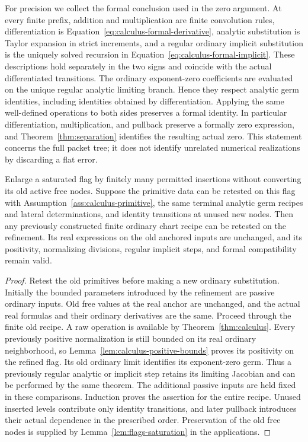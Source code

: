 For precision we collect the formal conclusion used in the zero argument.
At every finite prefix, addition and multiplication are finite convolution
rules, differentiation is Equation~\eqref{eq:calculus-formal-derivative},
analytic substitution is Taylor expansion in strict increments, and a
regular ordinary implicit substitution is the uniquely solved recursion
in Equation~\eqref{eq:calculus-formal-implicit}.  These descriptions hold
separately in the two signs and coincide with the actual differentiated
transitions.  The ordinary exponent-zero coefficients are evaluated on
the unique regular analytic limiting branch.  Hence they respect analytic germ
identities, including identities obtained by differentiation.  Applying the
same well-defined operations to both sides preserves a formal identity.
In particular differentiation, multiplication, and pullback preserve a
formally zero expression, and Theorem~\ref{thm:separation} identifies the
resulting actual zero.  This statement concerns the full packet tree; it does not
identify unrelated numerical realizations by discarding a flat error.

\begin{lemma}
\label{lem:calculus-refinement}
Enlarge a saturated flag by finitely many permitted insertions without
converting its old active free nodes.  Suppose the primitive data can be
retested on this flag with Assumption~\ref{ass:calculus-primitive}, the same
terminal analytic germ recipes and lateral determinations, and identity
transitions at unused new nodes.  Then any previously constructed finite
ordinary chart recipe can be retested on the refinement.  Its real
expressions on the old anchored inputs are unchanged, and its positivity,
normalizing divisions, regular implicit steps, and formal compatibility
remain valid.
\end{lemma}

\begin{proof}
Retest the old primitives before making a new ordinary substitution.
Initially the bounded parameters introduced by the refinement are passive
ordinary inputs.  Old free values at the real anchor are unchanged, and
the actual real formulas and their ordinary derivatives are the same.
Proceed through the finite old recipe.  A raw operation is available by
Theorem~\ref{thm:calculus}.  Every previously positive normalization is
still bounded on its real ordinary neighborhood, so
Lemma~\ref{lem:calculus-positive-bounds} proves its positivity on the
refined flag.  Its old ordinary limit identifies its exponent-zero germ.
Thus a previously regular analytic or implicit step retains its limiting
Jacobian and can be performed by the same theorem.  The additional
passive inputs are held fixed in these comparisons.  Induction proves
the assertion for the entire recipe.  Unused inserted levels contribute
only identity transitions, and later pullback introduces their actual
dependence in the prescribed order.  Preservation of the old free nodes
is supplied by Lemma~\ref{lem:flags-saturation} in the applications.
\end{proof}

